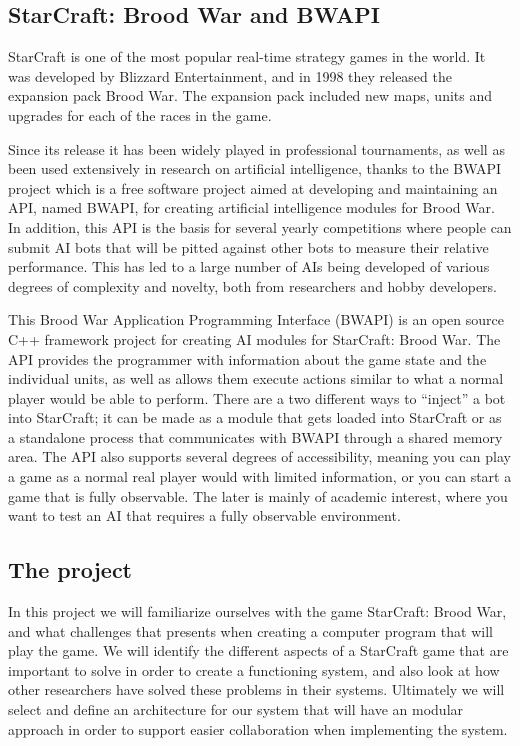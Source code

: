 \subsection{StarCraft: Brood War and BWAPI}
StarCraft is one of the most popular real-time strategy games in the world. It
was developed by Blizzard Entertainment, and in 1998 they released the expansion
pack Brood War. The expansion pack included new maps, units and upgrades for
each of the races in the game.
 
Since its release it has been widely played in professional tournaments, as well
as been used extensively in research on artificial intelligence, thanks to the
BWAPI project which is a free software project aimed at developing and
maintaining an API, named BWAPI, for creating artificial intelligence modules
for Brood War. In addition, this API is the basis for several yearly
competitions where people can submit AI bots that will be pitted against other
bots to measure their relative performance. This has led to a large number of
AIs being developed of various degrees of complexity and novelty, both from
researchers and hobby developers. 

This Brood War Application Programming Interface (BWAPI) is an open source C++
framework project for creating AI modules for StarCraft: Brood War. The API
provides the programmer with information about the game state and the individual
units, as well as allows them execute actions similar to what a normal player
would be able to perform. There are a two different ways to ``inject'' a bot
into StarCraft; it can be made as a module that gets loaded into StarCraft or as
a standalone process that communicates with BWAPI through a shared memory area.
The API also supports several degrees of accessibility, meaning you can play a
game as a normal real player would with limited information, or you can start a
game that is fully observable. The later is mainly of academic interest, where
you want to test an AI that requires a fully observable environment.  

\subsection{The project}
In this project we will familiarize ourselves with the game StarCraft: Brood
War, and what challenges that presents when creating a computer program that
will play the game. We will identify the different aspects of a StarCraft game
that are important to solve in order to create a functioning system, and also
look at how other researchers have solved these problems in their systems.
Ultimately we will select and define an architecture for our system that will
have an modular approach in order to support easier collaboration when
implementing the system. 

